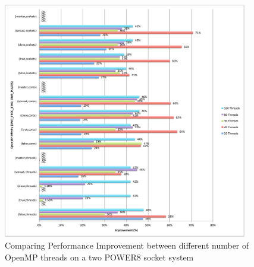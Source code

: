\begin{figure}[h!]
  \centering
  \includegraphics[height=1.4\textwidth, width=0.95\textwidth]{./Images/ImpAllV.pdf}
       \caption{Comparing Performance Improvement between different number of OpenMP threads on a two POWER8 socket system}
       \label{fig:imp}
\end{figure}

